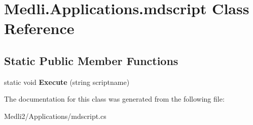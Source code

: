 \hypertarget{class_medli_1_1_applications_1_1mdscript}{}\section{Medli.\+Applications.\+mdscript Class Reference}
\label{class_medli_1_1_applications_1_1mdscript}
\subsection*{Static Public Member Functions}
\begin{DoxyCompactItemize}
\item 
\mbox{\label{class_medli_1_1_applications_1_1mdscript_acc1e39acbecd211c39a909b3e6fe7608}} 
static void {\bfseries Execute} (string scriptname)
\end{DoxyCompactItemize}


The documentation for this class was generated from the following file\+:\begin{DoxyCompactItemize}
\item 
Medli2/\+Applications/mdscript.\+cs\end{DoxyCompactItemize}
